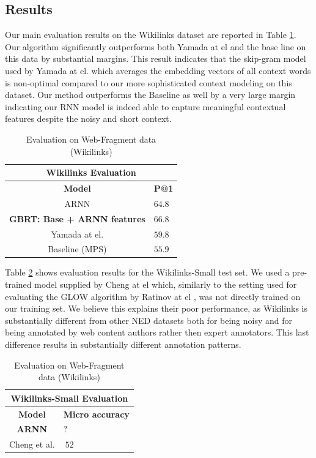 \documentclass[11pt]{article}
\begin{document}
\subsection{Results}

Our main evaluation results on the Wikilinks dataset are reported in Table \ref{tab:wikilink}. Our algorithm significantly outperforms both Yamada at el and the base line on this data by substantial margins. This result indicates that the skip-gram model used by Yamada at el. which averages the embedding vectors of all context words is non-optimal compared to our more sophisticated context modeling on this dataset. Our method outperforms the Baseline as well by a very large margin indicating our RNN model is indeed able to capture meaningful contextual features despite the noisy and short context.

\begin{table}[h]
	\begin{center}
		\begin{tabular}{|c| p{1.5cm}|}
			\hline \multicolumn{2}{|c|}{Wikilinks Evaluation} \\
			\hline \bf Model & \bf P@1  \\ \hline
			ARNN  &                              $64.8$ \\
			\bf GBRT: Base + ARNN features & \bf $66.8$ \\
			Yamada at el. &                      $59.8$ \\
			Baseline (MPS) &                     $55.9$ \\
			\hline
		\end{tabular}
	\end{center}
	\caption{\label{tab:wikilink} Evaluation on Web-Fragment data (Wikilinks)}
\end{table}

Table \ref{tab:wikilinks-small} shows evaluation results for the Wikilinks-Small test set. We used a pre-trained model supplied by Cheng at el which, similarly to the setting used for evaluating the GLOW algorithm by Ratinov at el \cite{ratinov2011glow}, was not directly trained on our training set. We believe this explains their poor performance, as Wikilinks is substantially different from other NED datasets both for being noisy and for being annotated by web content authors rather then expert annotators. This last difference results in substantially different annotation patterns.

\begin{table}[h]
	\begin{center}
		\begin{tabular}{|c| p{1.5cm}|}
			\hline \multicolumn{2}{|c|}{Wikilinks-Small Evaluation} \\
			\hline \bf Model & \bf Micro     accuracy  \\ \hline
			\bf ARNN  &  \bf $?$ \\
			Cheng et al. & $~52$ \\
			\hline
		\end{tabular}
	\end{center}
	\caption{\label{tab:wikilinks-small} Evaluation on Web-Fragment data (Wikilinks)}
\end{table}
\end{document}
